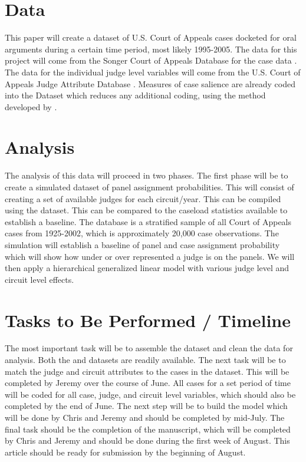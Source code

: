 \documentclass[12pt]{article}
\begin{document}
\section*{Data}
This paper will create a dataset of U.S. Court of Appeals cases docketed for oral arguments during a certain time period, most likely 1995-2005.  The data for this project will come from the Songer Court of Appeals Database for the case data \citep{Songer2007}.  The data for the individual judge level variables will come from the U.S. Court of Appeals Judge Attribute Database \citep{Gryski2008}.  Measures of case salience are already coded into the \citeauthor{Songer2007} Dataset which reduces any additional coding, using the method developed by \citet{Hettinger2003}.

\section*{Analysis}
The analysis of this data will proceed in two phases.  The first phase will be to create a simulated dataset of panel assignment probabilities.  This will consist of creating a set of available judges for each circuit/year.  This can be compiled using the \citeauthor{Gryski2008} dataset.  This can be compared to the caseload statistics available to establish a baseline.  The \citeauthor{Songer2007} database is a stratified sample of all Court of Appeals cases from 1925-2002, which is approximately 20,000 case observations.  The simulation will establish a baseline of panel and case assignment probability which will show how under or over represented a judge is on the panels.  We will then apply a hierarchical generalized linear model with various judge level and circuit level effects.  

\section*{Tasks to Be Performed / Timeline}
The most important task will be to assemble the dataset and clean the data for analysis.  Both the \citeauthor*{Songer2007} and \citeauthor{Gryski2008} datasets are readily available.  The next task will be to match the judge and circuit attributes to the cases in the \citeauthor{Songer2007} dataset.  This will be completed by Jeremy over the course of June.  All cases for a set period of time will be coded for all case, judge, and circuit level variables, which should also be completed by the end of June.  The next step will be to build the model which will be done by Chris and Jeremy and should be completed by mid-July.  The final task should be the completion of the manuscript, which will be completed by Chris and Jeremy and should be done during the first week of August.  This article should be ready for submission by the beginning of August.

\singlespacing
\scriptsize


\end{document}
